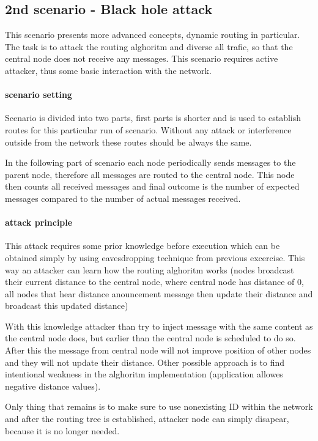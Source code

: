 \documentclass[
  digital, %
  table,   %
  nolof,     %
  nolot,     %
           oneside
]{fithesis3}
\begin{document}
    \subsection{2nd scenario - Black hole attack} \label{subsec:2nd}
    This scenario presents more advanced concepts, dynamic routing in particular. The task is to attack the routing alghoritm and diverse all trafic, so that the central node does not receive any messages. This scenario requires active attacker, thus some basic interaction with the network.

    \paragraph{scenario setting}
    Scenario is divided into two parts, first parts is shorter and is used to establish routes for this particular run of scenario. Without any attack or interference outside from the network these routes should be always the same.

    In the following part of scenario each node periodically sends messages to the parent node, therefore all messages are routed to the central node. This node then counts all received messages and final outcome is the number of expected messages compared to the number of actual messages received.

    \paragraph{attack principle}
    This attack requires some prior knowledge before execution which can be obtained simply by using eavesdropping technique from previous excercise. This way an attacker can learn how the routing alghoritm works (nodes broadcast their current distance to the central node, where central node has distance of 0, all nodes that hear distance anouncement message then update their distance and broadcast this updated distance)

    With this knowledge attacker than try to inject message with the same content as the central node does, but earlier than the central node is scheduled to do so. After this the message from central node will not improve position of other nodes and they will not update their distance. Other possible approach is to find intentional weakness in the alghoritm implementation (application allowes negative distance values).

    Only thing that remains is to make sure to use nonexisting ID within the network and after the routing tree is established, attacker node can simply disapear, because it is no longer needed.
\end{document}
